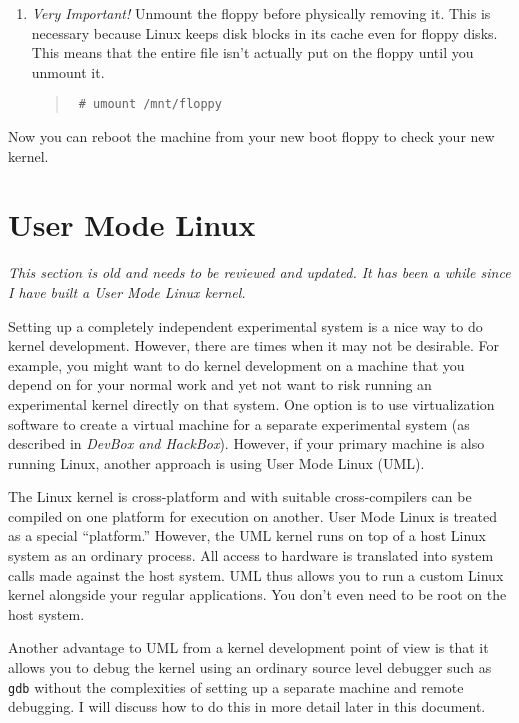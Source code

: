 \documentclass{article}
\newcommand{\command}[1]{\texttt{#1}}
\newenvironment{commands}
  {\begin{quote} \tt}
  {\end{quote}}
\begin{document}
\begin{enumerate}
\item \emph{Very Important!} Unmount the floppy before physically removing it. This is necessary
  because Linux keeps disk blocks in its cache even for floppy disks. This means that the entire
  file isn't actually put on the floppy until you unmount it.
  \begin{commands}
    \# umount /mnt/floppy
  \end{commands}

\end{enumerate}

Now you can reboot the machine from your new boot floppy to check your new kernel.

\section{User Mode Linux}
\label{sec:UML}

\textit{This section is old and needs to be reviewed and updated. It has been a while since I
  have built a User Mode Linux kernel.}

Setting up a completely independent experimental system is a nice way to do kernel development.
However, there are times when it may not be desirable. For example, you might want to do kernel
development on a machine that you depend on for your normal work and yet not want to risk
running an experimental kernel directly on that system. One option is to use virtualization
software to create a virtual machine for a separate experimental system (as described in
\textit{DevBox and HackBox}). However, if your primary machine is also running Linux, another
approach is using User Mode Linux (UML).

The Linux kernel is cross-platform and with suitable cross-compilers can be compiled on one
platform for execution on another. User Mode Linux is treated as a special ``platform.''
However, the UML kernel runs on top of a host Linux system as an ordinary process. All access to
hardware is translated into system calls made against the host system. UML thus allows you to
run a custom Linux kernel alongside your regular applications. You don't even need to be root on
the host system.

Another advantage to UML from a kernel development point of view is that it allows you to debug
the kernel using an ordinary source level debugger such as \command{gdb} without the
complexities of setting up a separate machine and remote debugging. I will discuss how to do
this in more detail later in this document.
\end{document}
